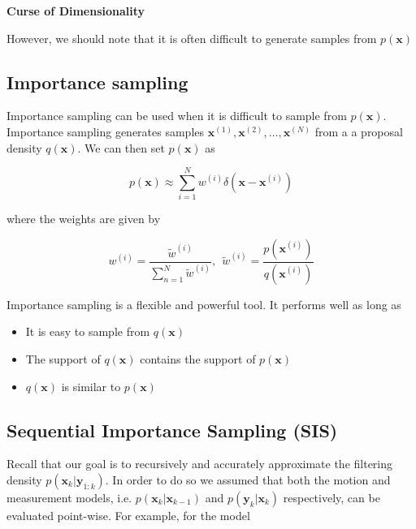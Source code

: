\begin{framed}
\theoremstyle{remark}
\begin{remark}{\textbf{Curse of Dimensionality}}

\end{remark}
\end{framed}

However, we should note that it is often difficult to generate samples from $p(\mathbf{x})$

\subsection{Importance sampling}
\label{importance_sampling}

Importance sampling can be used when it is difficult to sample from $p(\mathbf{x})$. Importance sampling generates samples
$\mathbf{x}^{(1)}, \mathbf{x}^{(2)}, \ldots, \mathbf{x}^{(N)}$ from a a proposal density $q(\mathbf{x})$. We can then set $p(\mathbf{x})$ as

\begin{equation}
p(\mathbf{x}) \approx \sum_{i=1}^N w^{(i)} \delta (\mathbf{x} -\mathbf{x}^{(i)})
\end{equation} 

where the weights are given by

\begin{equation}
w^{(i)} = \frac{\tilde{w}^{(i)}}{\sum_{n=1}^N \tilde{w}^{(i)}}, ~~ \tilde{w}^{(i)} = \frac{p(\mathbf{x}^{(i)})}{q(\mathbf{x}^{(i)})}
\end{equation}

Importance sampling is a flexible and powerful tool. It performs well as long as

\begin{itemize}
\item It is easy to sample from $q(\mathbf{x})$
\item The support of $q(\mathbf{x})$ contains the support of $p(\mathbf{x})$
\item $q(\mathbf{x})$ is similar to $p(\mathbf{x})$
\end{itemize}

\subsection{Sequential Importance Sampling (SIS)}
\label{sequential_importance_sampling}

Recall that our goal is to recursively and accurately approximate the filtering density $p(\mathbf{x}_k | \mathbf{y}_{1:k})$.
In order to do so we assumed that both the motion and measurement models, i.e. $p(\mathbf{x}_k | \mathbf{x}_{k-1})$ and $p(\mathbf{y}_k | \mathbf{x}_{k})$
respectively, can be evaluated point-wise. For example, for the model 

